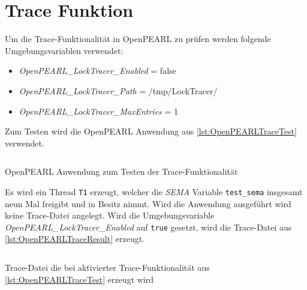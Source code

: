 \section{Trace Funktion}\label{Validierung:Trace Funktion}
\label{section:ValidierungTraceFunktion}
Um die Trace-Funktionalität in OpenPEARL zu prüfen werden folgende
Umgebungsvariablen verwendet:
\begin{itemize}
  \item \emph{OpenPEARL\-\_LockTracer\-\_Enabled} = false
  \item \emph{OpenPEARL\-\_LockTracer\-\_Path} = /tmp/LockTracer/
  \item \emph{OpenPEARL\-\_LockTracer\-\_MaxEntries} = 1
\end{itemize}
Zum Testen wird die OpenPEARL Anwendung aus \cref{lst:OpenPEARLTraceTest}
verwendet. 
\begin{listing}[ht]
  \inputminted[frame=lines,linenos]{vim}{./OpenPEARL/TraceTest.prl}
  \caption{OpenPEARL Anwendung zum Testen der Trace-Funktionalität}
  \label{lst:OpenPEARLTraceTest}
\end{listing}
Es wird ein Thread \texttt{T1} erzeugt, welcher die \emph{SEMA} Variable
\texttt{test\_sema} insgesamt neun Mal freigibt und in Besitz nimmt. Wird die
Anwendung ausgeführt wird keine Trace-Datei angelegt. Wird die Umgebungsvariable
\emph{OpenPEARL\-\_LockTracer\-\_Enabled} auf \texttt{true} gesetzt, wird die
Trace-Datei aus \cref{lst:OpenPEARLTraceResult} erzeugt.
\begin{listing}[ht]
  \begin{minipage}[ht]{\linewidth}
    \begin{multicols}{2}
      \inputminted[linenos]{text}{./OpenPEARL/TraceTestResult.log}
    \end{multicols}
    \caption{Trace-Datei die bei aktivierter Trace-Funktionalität aus \cref{lst:OpenPEARLTraceTest} erzeugt wird}
  \label{lst:OpenPEARLTraceResult}
  \end{minipage}
\end{listing}

